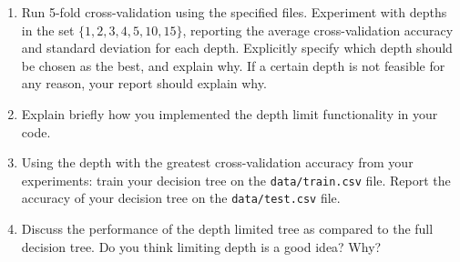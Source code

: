 \begin{enumerate}
  \begin{enumerate}
  \item \relax[15 points] Run 5-fold cross-validation using the specified
    files. Experiment with depths in the set $\{1, 2, 3, 4, 5, 10, 15\}$,
    reporting the average cross-validation accuracy and standard deviation for
    each depth. Explicitly specify which depth should be chosen as the best, and
    explain why. If a certain depth is not feasible for any reason, your report
    should explain why.
  \item \relax [4 points] Explain briefly how you implemented the depth limit
    functionality in your code.
  \item \relax[15 points] Using the depth with the greatest cross-validation
    accuracy from your experiments: train your decision tree on the
    \texttt{data/train.csv} file. Report the accuracy of your decision tree on the
    \texttt{data/test.csv} file.
  \item \relax[5 points] Discuss the performance of the depth limited tree as
    compared to the full decision tree. Do you think limiting depth is a good idea?
    Why?
  \end{enumerate}

\end{enumerate}

